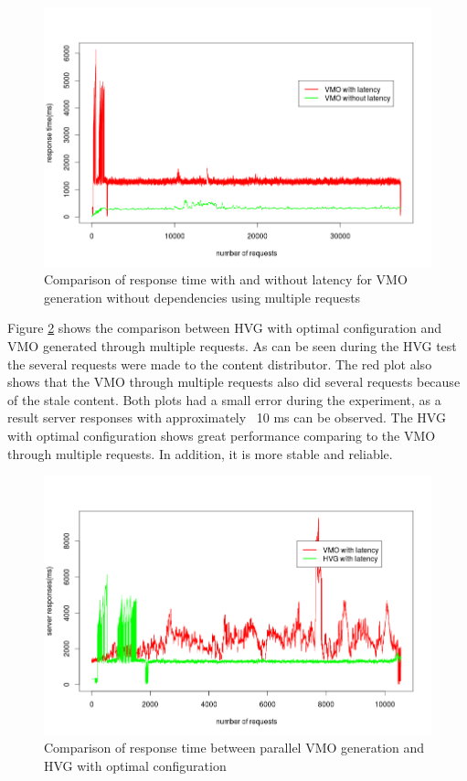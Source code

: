 \begin{figure}[h]
    \centering
    \includegraphics[width=\textwidth]{images/vmo_parallel_comparison.png}
    \caption{Comparison of response time with and without latency for VMO generation without dependencies using multiple requests}
    \label{fig:vmo_comparison}
\end{figure}


Figure \ref{fig:hvg_vmo_latency_comp} shows the comparison between HVG with optimal configuration and VMO generated through multiple requests. As can be seen during the HVG test the several requests were made to the content distributor. The red plot also shows that the VMO through multiple requests also did several requests because of the stale content. Both plots had a small error during the experiment, as a result server responses with approximately ~10 ms can be observed. The HVG with optimal configuration shows great performance comparing to the VMO through multiple requests. In addition, it is more stable and reliable. 

\begin{figure}[h]
    \centering
    \includegraphics[width=\textwidth]{images/hvg_vmo_latency_comparison.png}
    \caption{Comparison of response time between parallel VMO generation and HVG with optimal configuration}
    \label{fig:hvg_vmo_latency_comp}
\end{figure}


